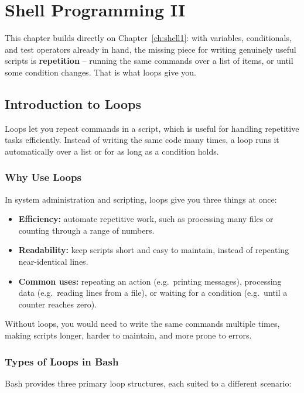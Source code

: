 
\chapter{Shell Programming II}
\label{ch:shell2}

This chapter builds directly on Chapter~\ref{ch:shell1}: with variables, conditionals, and test operators already in hand, the missing piece for writing genuinely useful scripts is \textbf{repetition} -- running the same commands over a list of items, or until some condition changes. That is what loops give you.

\section{Introduction to Loops}
Loops let you repeat commands in a script, which is useful for handling repetitive tasks efficiently. Instead of writing the same code many times, a loop runs it automatically over a list or for as long as a condition holds.

\subsection{Why Use Loops}
In system administration and scripting, loops give you three things at once:
\begin{itemize}
    \item \textbf{Efficiency:} automate repetitive work, such as processing many files or counting through a range of numbers.
    \item \textbf{Readability:} keep scripts short and easy to maintain, instead of repeating near-identical lines.
    \item \textbf{Common uses:} repeating an action (e.g.\ printing messages), processing data (e.g.\ reading lines from a file), or waiting for a condition (e.g.\ until a counter reaches zero).
\end{itemize}
Without loops, you would need to write the same commands multiple times, making scripts longer, harder to maintain, and more prone to errors.

\subsection{Types of Loops in Bash}
Bash provides three primary loop structures, each suited to a different scenario:

